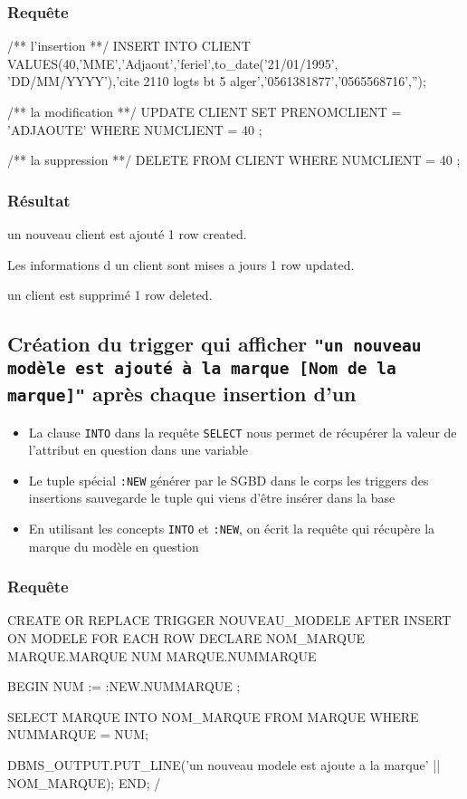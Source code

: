 \documentclass[•]{article}
\begin{document}
\subsubsection{Requête}
\begin{sql}
/** l'insertion **/
INSERT INTO CLIENT 
VALUES(40,'MME','Adjaout','feriel',to_date('21/01/1995', 'DD/MM/YYYY'),'cite 2110 logts bt 5 alger','0561381877','0565568716','');

/** la modification **/
UPDATE CLIENT 
SET PRENOMCLIENT = 'ADJAOUTE' 
WHERE NUMCLIENT = 40 ;

/** la suppression **/
DELETE FROM CLIENT 
WHERE NUMCLIENT = 40 ;

\end{sql}
\subsubsection{Résultat}
\begin{sql}
un nouveau client est ajouté
1 row created.

Les informations d un client sont mises a jours
1 row updated.

un client est supprimé
1 row deleted.
\end{sql}

\subsection{Création du trigger qui afficher \texttt{"un nouveau modèle est ajouté à la marque [Nom de la marque]"}
après chaque insertion d'un}

\begin{itemize}
\item
La clause \texttt{INTO} dans la requête \texttt{SELECT} nous permet de récupérer la 
valeur de l'attribut en question dans une variable
\item
Le tuple spécial \texttt{:NEW} générer par le SGBD dans le corps les triggers des insertions 
sauvegarde le tuple qui viens d'être insérer dans la base
\item
En utilisant les concepts \texttt{INTO} et \texttt{:NEW}, on écrit la requête qui récupère la marque du modèle en question
\end{itemize}


\subsubsection{Requête}
\begin{sql}
CREATE OR REPLACE TRIGGER NOUVEAU_MODELE
AFTER INSERT ON MODELE
FOR EACH ROW
DECLARE 
NOM_MARQUE MARQUE.MARQUE%
NUM MARQUE.NUMMARQUE%

BEGIN
    NUM := :NEW.NUMMARQUE ;

	SELECT MARQUE INTO NOM_MARQUE
	FROM MARQUE WHERE NUMMARQUE = NUM;


	DBMS_OUTPUT.PUT_LINE('un nouveau modele est ajoute a la marque' || NOM_MARQUE);
END;
/
\end{sql}
\end{document}
